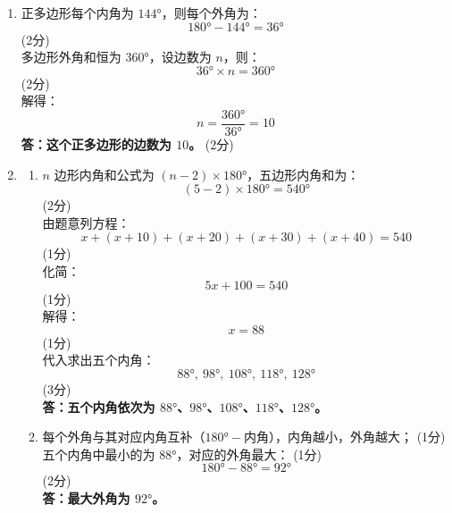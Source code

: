 \documentclass[12pt,a4paper]{exam-zh}
\begin{document}
\begin{solution}
    \begin{enumerate}[label=(\alph*)]
        \item 正多边形每个内角为 $144°$，则每个外角为：
        $$180° - 144° = 36°$$ \hfill (2分) \\
        多边形外角和恒为 $360°$，设边数为 $n$，则：
        $$36° \times n = 360°$$ \hfill (2分) \\
        解得：
        $$n = \frac{360°}{36°} = 10$$
        \textbf{答：这个正多边形的边数为 $10$。} \hfill (2分)

        \item
        \begin{enumerate}[label=(\roman*)]
            \item $n$ 边形内角和公式为 $(n-2)\times180°$，五边形内角和为：
            $$(5-2)\times180° = 540°$$ \hfill (2分) \\
            由题意列方程：
            $$x+(x+10)+(x+20)+(x+30)+(x+40) = 540$$ \hfill (1分) \\
            化简：
            $$5x+100 = 540$$ \hfill (1分) \\
            解得：
            $$x = 88$$ \hfill (1分) \\
            代入求出五个内角：
            $$88°,\ 98°,\ 108°,\ 118°,\ 128°$$ \hfill (3分) \\
            \textbf{答：五个内角依次为 $88°$、$98°$、$108°$、$118°$、$128°$。}

            \item 每个外角与其对应内角互补（$180°-$内角），内角越小，外角越大； \hfill (1分) \\
            五个内角中最小的为 $88°$，对应的外角最大： \hfill (1分) \\
            $$180°-88° = 92°$$ \hfill (2分) \\
            \textbf{答：最大外角为 $92°$。}
        \end{enumerate}
    \end{enumerate}
\end{solution}
\end{document}
